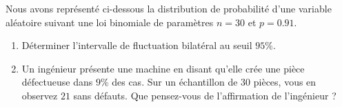 
\begin{exercice}\label{exosmath-0384}

Nous avons représenté ci-dessous la distribution de probabilité d'une variable aléatoire suivant une loi binomiale de paramètres \( n=30\) et \( p=0.91\). 

\begin{center}
   
\end{center}

\begin{enumerate}
    \item
Déterminer l'intervalle de fluctuation bilatéral au seuil \( 95\%\).
        \item
            Un ingénieur présente une machine en disant qu'elle crée une pièce défectueuse dans \( 9\%\) des cas. Sur un échantillon de \( 30\) pièces, vous en observez \( 21\) sans défauts. Que pensez-vous de l'affirmation de l'ingénieur ?
\end{enumerate}


\end{exercice}
